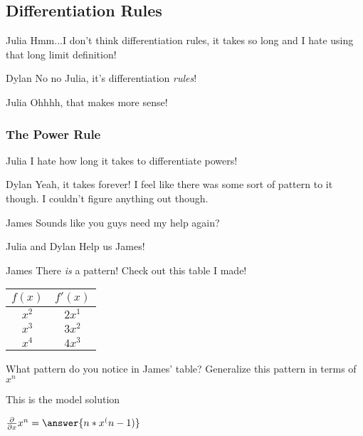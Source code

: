 \documentclass{ximera}
\begin{document}
\subsection{Differentiation Rules}
\begin{dialogue}
\item[Julia] Hmm...I don't think differentiation rules, it takes so long and I hate using that long limit definition!
\item[Dylan] No no Julia, it's differentiation \textit{rules}!
\item[Julia] Ohhhh, that makes more sense!

\end{dialogue}
\subsubsection{The Power Rule}
\begin{dialogue}
\item[Julia] I hate how long it takes to differentiate powers!
\item[Dylan] Yeah, it takes forever! I feel like there was some sort of pattern to it though. I couldn't figure anything out though.
\item[James] Sounds like you guys need my help again?
\item[Julia and Dylan] Help us James!
\item[James] There \textit{is} a pattern! Check out this table I made!
\begin{center}
\begin{tabular}{c|c}
$f(x)$ & $f'(x)$ \\
\hline
$x^2$ & $2x^1$ \\
$x^3$ & $3x^2$ \\
$x^4$ & $4x^3$ 
\end{tabular}
\end{center}
\end{dialogue}
\begin{question}
What pattern do you notice in James' table? Generalize this pattern in terms of $x^n$
\begin{freeResponse}
This is the model solution %
\end{freeResponse}
\end{question}
\begin{question}
$ \frac{\partial}{\partial x} x^n =  \answer{n*x^(n-1)}$
\end{question}
\end{document}
